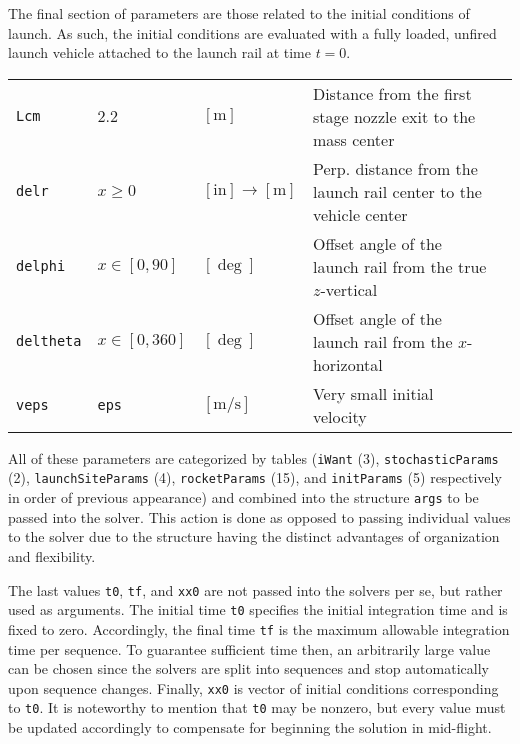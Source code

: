 \documentclass[11pt]{thesis}
\numberwithin{equation}{section}
\begin{document}
The final section of parameters are those related to the initial conditions of launch. As such, the initial conditions are evaluated with a fully loaded, unfired launch vehicle attached to the launch rail at time $t = 0$.
\begin{longtable}[l]{l l l l l}
\texttt{Lcm} & $2.2$ & $[\si{\m}]$ & Distance from the first stage nozzle exit to the mass center \\
\texttt{delr} & $x \geq 0$ & $[\mathrm{in}] \rightarrow [\si{\m}]$ & Perp. distance from the launch rail center to the vehicle center \\
\texttt{delphi} & $x \in [0, 90]$ & $[\si{\deg}]$ & Offset angle of the launch rail from the true $z$-vertical \\
\texttt{deltheta} & $x \in [0,360]$ & $[\si{\deg}]$ & Offset angle of the launch rail from the $x$-horizontal \\
\texttt{veps} & \texttt{eps} & $[\si{\m/\s}]$ & Very small initial velocity
\end{longtable}

All of these parameters are categorized by tables (\texttt{iWant} (3), \texttt{stochasticParams} (2), \texttt{launchSiteParams} (4), \texttt{rocketParams} (15), and \texttt{initParams} (5) respectively in order of previous appearance) and combined into the structure \texttt{args} to be passed into the solver. This action is done as opposed to passing individual values to the solver due to the structure having the distinct advantages of organization and flexibility.

The last values \texttt{t0}, \texttt{tf}, and \texttt{xx0} are not passed into the solvers per se, but rather used as arguments. The initial time \texttt{t0} specifies the initial integration time and is fixed to zero. Accordingly, the final time \texttt{tf} is the maximum allowable integration time per sequence. To guarantee sufficient time then, an arbitrarily large value can be chosen since the solvers are split into sequences and stop automatically upon sequence changes. Finally, \texttt{xx0} is vector of initial conditions corresponding to \texttt{t0}. It is noteworthy to mention that \texttt{t0} may be nonzero, but every value must be updated accordingly to compensate for beginning the solution in mid-flight.
\end{document}
